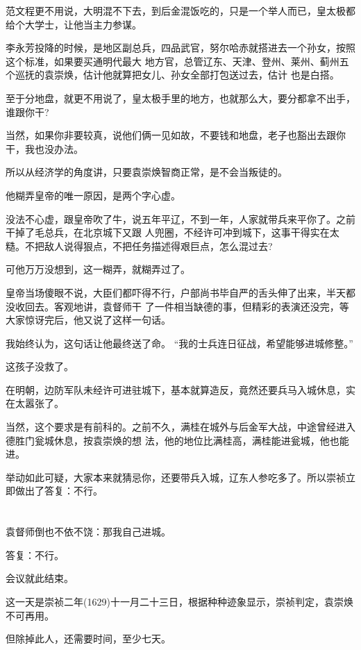 \documentclass[11pt,a4paper,onecolumn]{article}
\begin{document}
范文程更不用说，大明混不下去，到后金混饭吃的，只是一个举人而已，皇太极都给个大学士，让他当主力参谋。

李永芳投降的时候，是地区副总兵，四品武官，努尔哈赤就搭进去一个孙女，按照这个标准，如果要买通明代最大
地方官，总管辽东、天津、登州、莱州、蓟州五个巡抚的袁崇焕，估计他就算把女儿、孙女全部打包送过去，估计
也是白搭。

至于分地盘，就更不用说了，皇太极手里的地方，也就那么大，要分都拿不出手，谁跟你干?

当然，如果你非要较真，说他们俩一见如故，不要钱和地盘，老子也豁出去跟你干，我也没办法。

所以从经济学的角度讲，只要袁崇焕智商正常，是不会当叛徒的。

他糊弄皇帝的唯一原因，是两个字\myrule 心虚。

没法不心虚，跟皇帝吹了牛，说五年平辽，不到一年，人家就带兵来平你了。之前干掉了毛总兵，在北京城下又跟
人兜圈，不经许可冲到城下，这事干得实在太糙。不把敌人说得狠点，不把任务描述得艰巨点，怎么混过去?

可他万万没想到，这一糊弄，就糊弄过了。

皇帝当场傻眼不说，大臣们都吓得不行，户部尚书毕自严的舌头伸了出来，半天都没收回去。客观地讲，袁督师干
了一件相当缺德的事，但精彩的表演还没完，等大家惊讶完后，他又说了这样一句话。

我始终认为，这句话让他最终送了命。 ``我的士兵连日征战，希望能够进城修整。''

这孩子没救了。

在明朝，边防军队未经许可进驻城下，基本就算造反，竟然还要兵马入城休息，实在太嚣张了。

当然，这个要求是有前科的。之前不久，满桂在城外与后金军大战，中途曾经进入德胜门瓮城休息，按袁崇焕的想
法，他的地位比满桂高，满桂能进瓮城，他也能进。

举动如此可疑，大家本来就猜忌你，还要带兵入城，辽东人参吃多了。所以崇祯立即做出了答复：不行。

\section[\thesection]{}

袁督师倒也不依不饶：那我自己进城。

答复：不行。

会议就此结束。

这一天是崇祯二年(1629)十一月二十三日，根据种种迹象显示，崇祯判定，袁崇焕不可再用。

但除掉此人，还需要时间，至少七天。
\end{document}
